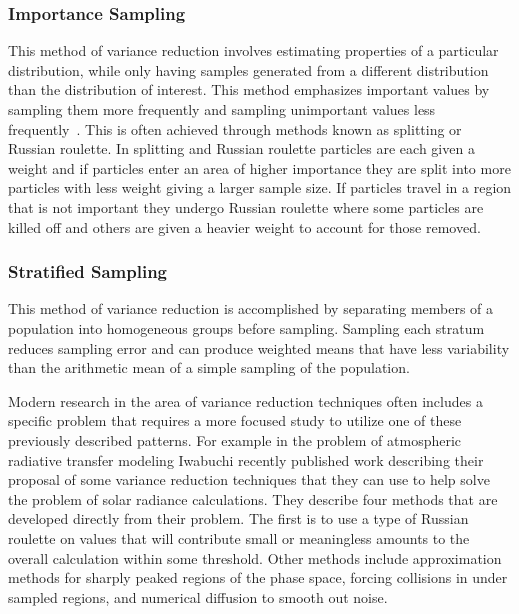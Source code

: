 \subsubsection*{\textbf{Importance Sampling}} This method of variance reduction involves estimating properties of a particular distribution, while only having samples generated from a different distribution than the distribution of interest. This method emphasizes important values by sampling them more frequently and sampling unimportant values less frequently~\cite{wikipediaImportanceSampling}. This is often achieved through methods known as splitting or Russian roulette. In splitting and Russian roulette particles are each given a weight and if particles enter an area of higher importance they are split into more particles with less weight giving a larger sample size. If particles travel in a region that is not important they undergo Russian roulette where some particles are killed off and others are given a heavier weight to account for those removed.~\cite{melnik2000rare}

\subsubsection*{\textbf{Stratified Sampling}} This method of variance reduction is accomplished by separating members of a population into homogeneous groups before sampling. Sampling each stratum reduces sampling error and can produce weighted means that have less variability than the arithmetic mean of a simple sampling of the population. ~\cite{wikipediaStratifiedSampling}

Modern research in the area of variance reduction techniques often includes a specific problem that requires a more focused study to utilize one of these previously described patterns.
%
For example in the problem of atmospheric radiative transfer modeling Iwabuchi recently published work describing their proposal of some variance reduction techniques that they can use to help solve the problem of solar radiance calculations.
%
They describe four methods that are developed directly from their problem.
%
The first is to use a type of Russian roulette on values that will contribute small or meaningless amounts to the overall calculation within some threshold.
%
Other methods include approximation methods for sharply peaked regions of the phase space, forcing collisions in under sampled regions, and numerical diffusion to smooth out noise.~\cite{iwabuchi2015efficient}
 